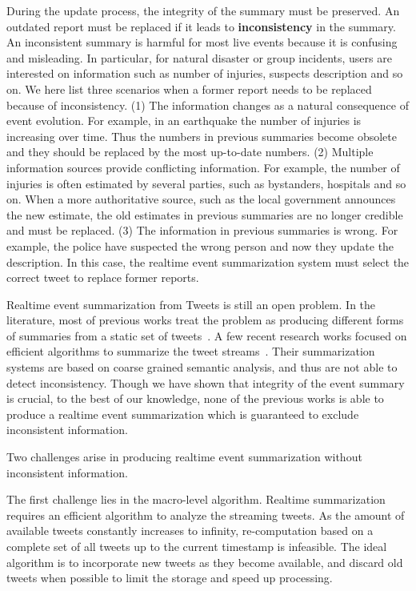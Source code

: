 \documentclass{llncs}
\begin{document}
During the update process, the integrity of the summary must be preserved.  An outdated report must be replaced if it leads to \textbf{inconsistency} in the summary. An inconsistent summary is harmful for most live events because it is confusing and misleading. In particular, for natural disaster or group incidents,  users are interested on  information such as number of injuries, suspects description and so on. We here list three scenarios when a former report needs to be replaced because of inconsistency. (1) The information changes as a natural consequence of event evolution. For example, in an earthquake the number of injuries is increasing over time. Thus the numbers in previous summaries become obsolete and they should be replaced by the most up-to-date numbers. (2) Multiple information sources provide conflicting information. For example, the number of injuries is often estimated by several parties, such as  bystanders, hospitals and so on. When a more authoritative source, such as the local government announces the new estimate, the old estimates in previous summaries are no longer credible and must be replaced. (3) The information in previous summaries is wrong. For example, the police have suspected the wrong person and now they update the description. In this case, the realtime event summarization system must select the correct tweet to replace former reports.


Realtime event summarization from Tweets is still an open problem. In the literature, most of previous works treat the problem as producing different forms of summaries from a static set of tweets~\cite{}. A few recent research works focused on efficient algorithms to summarize the tweet streams~\cite{}. Their summarization systems are based on coarse grained semantic analysis, and thus are not able to detect inconsistency. Though we have shown that integrity of the event summary is crucial, to the best of our knowledge, none of the previous works is able to produce a realtime event summarization which is guaranteed to exclude inconsistent information.


Two challenges arise in producing realtime event summarization without inconsistent information.

The first challenge lies in the macro-level algorithm. Realtime summarization requires an efficient algorithm to analyze the streaming tweets. As the amount of available tweets constantly increases to infinity, re-computation based on a complete set of all tweets up to the current timestamp is infeasible. The ideal algorithm is to  incorporate new tweets as they become available, and discard old tweets when possible to limit the storage and speed up processing.
\end{document}
